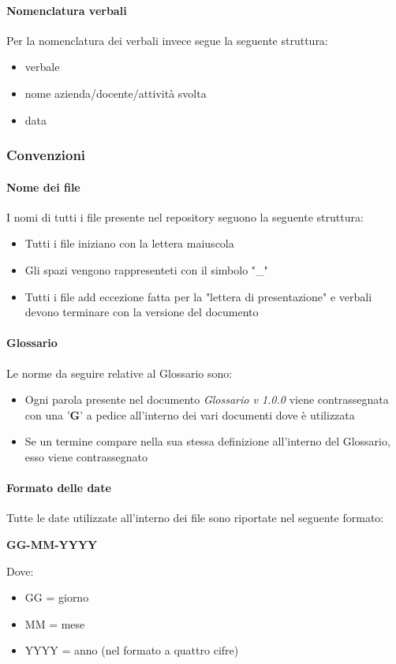 \documentclass[12pt]{article}
\begin{document}
\paragraph{Nomenclatura verbali}
Per la nomenclatura dei verbali invece segue la seguente struttura:
\begin{itemize}
    \item verbale
    \item nome azienda/docente/attività svolta
    \item data
\end{itemize}
\subsubsection{Convenzioni}
\paragraph{Nome dei file}
I nomi di tutti i file presente nel repository seguono la seguente struttura:
\begin{itemize}
    \item Tutti i file iniziano con la lettera maiuscola
    \item Gli spazi vengono rappresenteti con il simbolo "\_"
    \item Tutti i file add eccezione fatta per la "lettera di presentazione" e verbali devono terminare con la versione del documento
\end{itemize}

\paragraph{Glossario}
Le norme da seguire relative al Glossario sono:
\begin{itemize}
    \item Ogni parola presente nel documento \textit{Glossario v 1.0.0} viene contrassegnata con una '\textbf{G}' a
    pedice all'interno dei vari documenti dove è utilizzata
    \item Se un termine compare nella sua stessa definizione all'interno del Glossario, esso viene contrassegnato

\end{itemize}
    
\paragraph{Formato delle date}
Tutte le date utilizzate all'interno dei file sono riportate nel seguente formato:
\begin{center}
    \textbf{GG-MM-YYYY}

    Dove:
    \begin{itemize}
        \item GG = giorno
        \item MM = mese
        \item YYYY = anno (nel formato a quattro cifre)
    \end{itemize}
\end{center}
\end{document}

